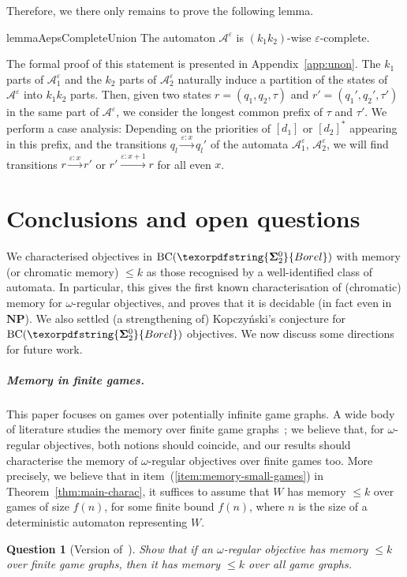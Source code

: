 \documentclass[a4paper,UKenglish,cleveref, thm-restate]{lipics-v2021}
\newtheorem{question}{Question}
\newcommand{\re}[1]{\xrightarrow{#1}}
\newcommand{\eps}{\varepsilon}
\newcommand{\boldclass}[3]{\texorpdfstring{\ensuremath{\mathbf{#1}^{#2}_{#3}}}{Borel}}
\newcommand{\BCSigma}{\mathrm{BC}(\boldclass{\Sigma}{0}{2})}
\newcommand{\A}{\mathcal{A}}
\newcommand{\NP}{\textbf{NP}}
\newcommand{\done}{[d_1]}
\newcommand{\dtwo}{[d_2]^*}
\newcommand{\oo}{\omega}
\begin{document}
Therefore, we there only remains to prove the following lemma.

\begin{restatable}{lemma}{AepsCompleteUnion}\label{lem:A-eps-complete-union}
     The automaton $\A^\eps$ is $(k_{1}k_{2})$-wise $\eps$-complete. 
 \end{restatable}

The formal proof of this statement is presented in Appendix~\ref{app:unon}.
The $k_1$ parts of $\A_1^\eps$ and the $k_2$ parts of $\A_2^\eps$ naturally induce a partition of the states of $\A^\eps$ into $k_1k_2$ parts.
Then, given two states $r = (q_1,q_2,\tau)$ and $r' = (q_1',q_2', \tau')$ in the same part of $\A^\eps$, we consider the longest common prefix of $\tau$ and $\tau'$. We perform a case analysis: Depending on the priorities of $\done$ or $\dtwo$ appearing in this prefix, and the transitions $q_l \re{\eps:x} q_l'$ of the automata $\A_1^\eps$, $\A_2^\eps$, we will find transitions $r\re{\eps:x} r'$ or $r'\re{\eps:x+1} r$ for all even $x$.
 

\section{Conclusions and open questions}

We characterised objectives in $\BCSigma$ with memory (or chromatic memory) $\leq k$ as those recognised by a well-identified class of automata.
In particular, this gives the first known characterisation of (chromatic) memory for $\omega$-regular objectives, and proves that it is decidable (in fact even in $\NP$).
We also settled (a strengthening of) Kopczyński's conjecture for $\BCSigma$ objectives.
We now discuss some directions for future work.

\subparagraph*{Memory in finite games.}
This paper focuses on games over potentially infinite game graphs. 
A wide body of literature studies the memory over finite game graphs~\cite{Kop08Thesis,BRORV22}; we believe that, for $\oo$-regular objectives, both notions should coincide, and our results should characterise the memory of $\oo$-regular objectives over finite games too. 
More precisely, we believe that in item~(\ref{item:memory-small-games}) in Theorem~\ref{thm:main-charac}, it suffices to assume that $W$ has memory $\leq k$ over games of size $f(n)$, for some finite bound $f(n)$, where $n$ is the size of a deterministic automaton representing $W$. 

\begin{question}[{Version of~\cite[Conjecture~9.1.2]{Vandenhove23Thesis}}]\label{quest:ptime}
	Show that if an $\oo$-regular objective has memory $\leq k$ over finite game graphs, then it has memory $\leq k$ over all game graphs.
\end{question}
\end{document}

